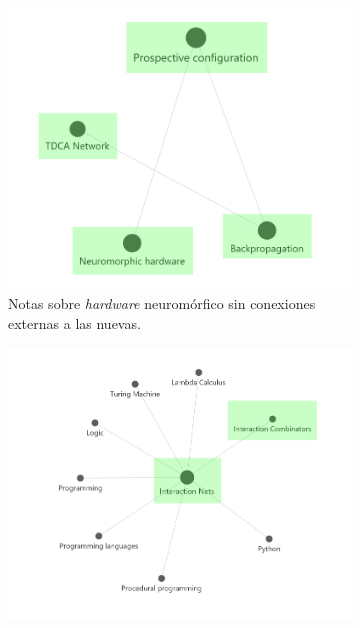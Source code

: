 \begin{figure}[h!]
    \centering
    \begin{subfigure}[b]{0.48\textwidth}
        \centering
        \includegraphics[width=\textwidth]{figures/neuromPart.png}
        \caption{Notas sobre \textit{hardware} neuromórfico sin conexiones externas a las nuevas.}
        \label{fig:wiki_isolated}
    \end{subfigure}
    \hfill
    \begin{subfigure}[b]{0.5\textwidth}
        \centering
        \includegraphics[width=\textwidth]{figures/IntNetsPart.png}

\end{subfigure}
\end{figure}

